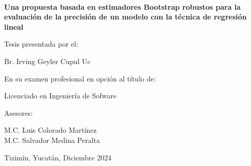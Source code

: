 \documentclass[12pt]{article}
\begin{document}
	\hskip -0.9cm
	\begin{minipage}[c][1\totalheight][s]{1cm}
		\begin{center}
			\hskip2pt\vrule width3.5pt height19.5cm\hskip1mm
			\vrule width0.5pt height19.5cm\\[10pt]
		\end{center}
	\end{minipage}\hspace{0.5cm}\begin{minipage}[c][1\totalheight][s]{14cm}
		\begin{center}
			\vspace{1.5cm}
			
			{\selectfont\Large\textbf{Una propuesta basada en estimadores Bootstrap robustos para la evaluación de la precisión de un modelo con la técnica de regresión lineal}}
			
			\vspace{1cm}
			{{\selectfont\large Tesis presentada por el:}}\\
			
			\vspace{0.5cm}
			
			{{\selectfont\large Br. Irving Geyler Cupul Uc}}\\
			
			\vspace{1.5cm}
			
			{\selectfont\large En su examen profesional en opción al título de:}
			
			\vspace{0.5cm}
			
			{\selectfont\large Licenciado en Ingeniería de Sofware}
			
			\vspace{1.2cm}
			
			{\selectfont\large Asesores:}
			
			\vspace{0.5cm}
			
			{\selectfont\large M.C. Luis Colorado Martínez\\M.C. Salvador Medina Peralta}
			
			\vspace{4cm}
			{{\selectfont Tizimín, Yucatán, Diciembre 2024}}
		\end{center}
	\end{minipage}
	\newpage
	
	
	
	\newpage
	
	\newpage
	
	\newpage
	
	\newpage
	
	\newpage
	
	\newpage
	
	\newpage
	
	\newpage
	
	\printbibliography
\end{document}
